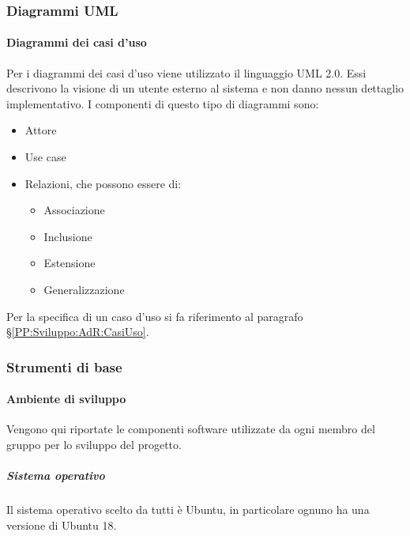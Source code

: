 		\subsubsection{Diagrammi UML}\label{PP:Sviluppo:UML}	%


		\paragraph{Diagrammi dei casi d'uso}	\label{DiagrammiCasiUso}
		Per i diagrammi dei casi d'uso viene utilizzato il linguaggio UML 2.0. Essi descrivono la visione di un utente esterno al sistema e non danno nessun dettaglio implementativo. I componenti di questo tipo di diagrammi sono:
		\begin{itemize}
			\item Attore
			\item Use case
			\item Relazioni, che possono essere di:
			\begin{itemize}
				\item Associazione
				\item Inclusione
				\item Estensione
				\item Generalizzazione
			\end{itemize}
		\end{itemize}
		Per la specifica di un caso d'uso si fa riferimento al paragrafo \S\ref{PP:Sviluppo:AdR:CasiUso}.




        \subsubsection{Strumenti di base}\label{PP:Sviluppo:Strumenti}

	    \paragraph{Ambiente di sviluppo}\label{PP:Sviluppo:Strumenti:AmbienteSviluppo}
	    Vengono qui riportate le componenti software utilizzate da ogni membro del gruppo per lo sviluppo del progetto.


	    \subparagraph{Sistema operativo}\label{PP:Sviluppo:Strumenti:AmbienteSviluppo:SistemaOperativo}
	    Il sistema operativo scelto da tutti è Ubuntu, in particolare ognuno ha una versione di Ubuntu 18.





